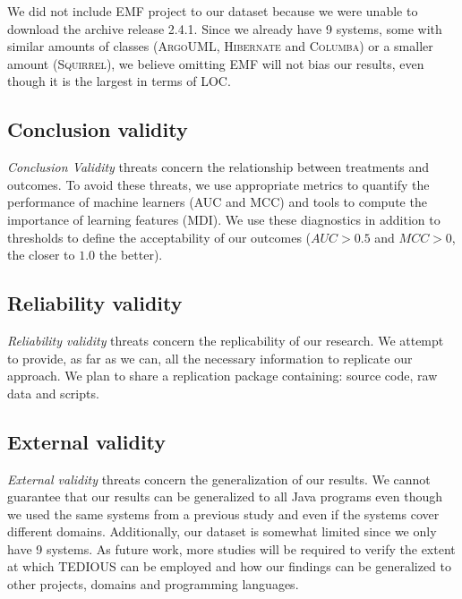 We did not include \textsc{EMF} project to our dataset because we were unable to download the archive release 2.4.1. Since we already have 9 systems, some with similar amounts of classes (\textsc{ArgoUML}, \textsc{Hibernate} and \textsc{Columba}) or a smaller amount (\textsc{Squirrel}), we believe omitting \textsc{EMF} will not bias our results, even though it is the largest in terms of LOC.

\subsection{Conclusion validity}


\textit{Conclusion Validity} threats concern the relationship between treatments and outcomes. To avoid these threats, we use appropriate metrics to quantify the performance of machine learners (AUC and MCC) and tools to compute the importance of learning features (MDI). We use these diagnostics in addition to thresholds to define the acceptability of our outcomes ($AUC>0.5$ and $MCC>0$, the closer to $1.0$ the better).

\subsection{Reliability validity}


\textit{Reliability validity} threats concern the replicability of our research. We attempt to provide, as far as we can, all the necessary information to replicate our approach. We plan to share a replication package containing: source code, raw data and scripts.

\subsection{External validity}


\textit{External validity} threats concern the generalization of our results. We cannot guarantee that our results can be generalized to all Java programs even though we used the same systems from a previous study \citep{maldonado17} and even if the systems cover different domains. Additionally, our dataset is somewhat limited since we only have 9 systems. As future work, more studies will be required to verify the extent at which TEDIOUS can be employed and how our findings can be generalized to other projects, domains and programming languages.








